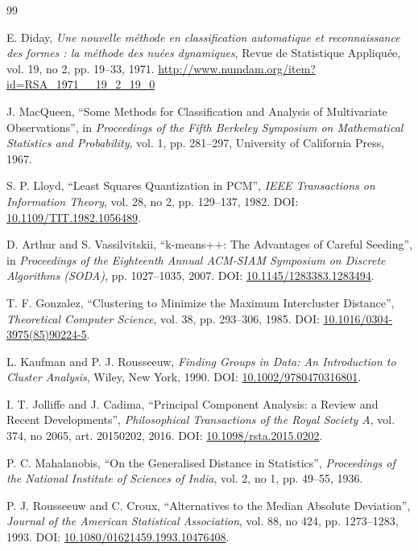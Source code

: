 \documentclass[12pt,a4paper]{article}
\begin{document}
\begin{thebibliography}{99}

E. Diday,
\textit{Une nouvelle méthode en classification automatique et reconnaissance des formes : la méthode des nuées dynamiques},
Revue de Statistique Appliquée, vol. 19, no 2, pp. 19--33, 1971.
\url{http://www.numdam.org/item?id=RSA_1971__19_2_19_0}

J. MacQueen,
``Some Methods for Classification and Analysis of Multivariate Observations'',
in \textit{Proceedings of the Fifth Berkeley Symposium on Mathematical Statistics and Probability}, vol. 1, pp. 281--297, University of California Press, 1967.

S. P. Lloyd,
``Least Squares Quantization in PCM'',
\textit{IEEE Transactions on Information Theory}, vol. 28, no 2, pp. 129--137, 1982.
DOI: \href{https://doi.org/10.1109/TIT.1982.1056489}{10.1109/TIT.1982.1056489}.

D. Arthur and S. Vassilvitskii,
``k-means++: The Advantages of Careful Seeding'',
in \textit{Proceedings of the Eighteenth Annual ACM-SIAM Symposium on Discrete Algorithms (SODA)}, pp. 1027--1035, 2007.
DOI: \href{https://doi.org/10.1145/1283383.1283494}{10.1145/1283383.1283494}.

T. F. Gonzalez,
``Clustering to Minimize the Maximum Intercluster Distance'',
\textit{Theoretical Computer Science}, vol. 38, pp. 293--306, 1985.
DOI: \href{https://doi.org/10.1016/0304-3975(85)90224-5}{10.1016/0304-3975(85)90224-5}.

L. Kaufman and P. J. Rousseeuw,
\textit{Finding Groups in Data: An Introduction to Cluster Analysis},
Wiley, New York, 1990.
DOI: \href{https://doi.org/10.1002/9780470316801}{10.1002/9780470316801}.

I. T. Jolliffe and J. Cadima,
``Principal Component Analysis: a Review and Recent Developments'',
\textit{Philosophical Transactions of the Royal Society A}, vol. 374, no 2065, art. 20150202, 2016.
DOI: \href{https://doi.org/10.1098/rsta.2015.0202}{10.1098/rsta.2015.0202}.

P. C. Mahalanobis,
``On the Generalised Distance in Statistics'',
\textit{Proceedings of the National Institute of Sciences of India}, vol. 2, no 1, pp. 49--55, 1936.

P. J. Rousseeuw and C. Croux,
``Alternatives to the Median Absolute Deviation'',
\textit{Journal of the American Statistical Association}, vol. 88, no 424, pp. 1273--1283, 1993.
DOI: \href{https://doi.org/10.1080/01621459.1993.10476408}{10.1080/01621459.1993.10476408}.


\end{thebibliography}
\end{document}
